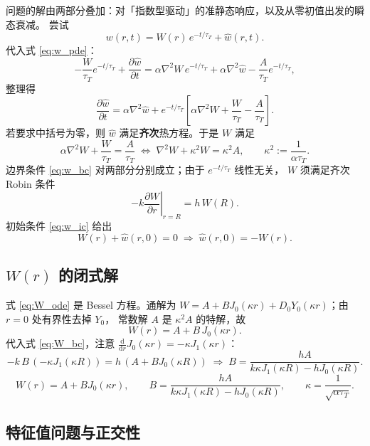 \documentclass[11pt,a4paper]{article}
\theoremstyle{definition}
\begin{document}
问题的解由两部分叠加：对「指数型驱动」的准静态响应，以及从零初值出发的瞬态衰减。
尝试
\begin{equation}
w(r,t)=W(r)\,e^{-t/\tau_T}+\hat w(r,t).
\label{eq:decomp}
\end{equation}
代入式 \eqref{eq:w_pde}：
\[
-\frac{W}{\tau_T}e^{-t/\tau_T}+\frac{\partial \hat w}{\partial t}
=\alpha\nabla^2W\,e^{-t/\tau_T}+\alpha\nabla^2\hat w-\frac{A}{\tau_T}e^{-t/\tau_T},
\]
整理得
\[
\frac{\partial \hat w}{\partial t}=\alpha\nabla^2\hat w
+e^{-t/\tau_T}\left[\alpha\nabla^2W+\frac{W}{\tau_T}-\frac{A}{\tau_T}\right].
\]
若要求中括号为零，则 $\hat w$ 满足\textbf{齐次}热方程。于是 $W$ 满足
\begin{equation}
\alpha\nabla^2W+\frac{W}{\tau_T}=\frac{A}{\tau_T}
\;\Longleftrightarrow\;
\nabla^2W+\kappa^2W=\kappa^2A,
\qquad
\kappa^2:=\frac{1}{\alpha\tau_T}.
\label{eq:W_ode}
\end{equation}
边界条件 \eqref{eq:w_bc} 对两部分分别成立；由于 $e^{-t/\tau_T}$ 线性无关，
$W$ 须满足齐次 Robin 条件
\begin{equation}
-k\left.\frac{\partial W}{\partial r}\right|_{r=R}=h\,W(R).
\label{eq:W_bc}
\end{equation}
初始条件 \eqref{eq:w_ic} 给出
\begin{equation}
W(r)+\hat w(r,0)=0\;\Longrightarrow\;\hat w(r,0)=-W(r).
\label{eq:what_ic}
\end{equation}

\subsection{$W(r)$ 的闭式解}

式 \eqref{eq:W_ode} 是 Bessel 方程。通解为
$W=A+BJ_0(\kappa r)+D_0Y_0(\kappa r)$；由 $r=0$ 处有界性去掉 $Y_0$，
常数解 $A$ 是 $\kappa^2A$ 的特解，故
\begin{equation}
W(r)=A+B\,J_0(\kappa r).
\label{eq:W_form}
\end{equation}
代入式 \eqref{eq:W_bc}，注意 $\frac{\mathrm{d}}{\mathrm{d}r}J_0(\kappa r)=-\kappa J_1(\kappa r)$：
\[
-k\,B\,(-\kappa J_1(\kappa R))=h\,(A+BJ_0(\kappa R))
\;\Longrightarrow\;
B=\frac{hA}{k\kappa J_1(\kappa R)-hJ_0(\kappa R)} .
\]
\begin{equation}
\boxed{\;W(r)=A+BJ_0(\kappa r),\qquad
B=\frac{hA}{k\kappa J_1(\kappa R)-hJ_0(\kappa R)},\qquad
\kappa=\frac{1}{\sqrt{\alpha\tau_T}}.\;}
\label{eq:W_sol}
\end{equation}

\subsection{特征值问题与正交性}
\end{document}
